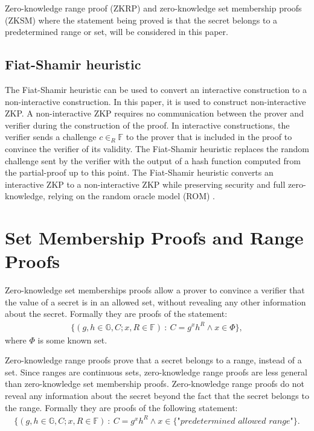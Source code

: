 Zero-knowledge range proof (ZKRP) and zero-knowledge set membership proofs (ZKSM) where the statement being proved is that the secret belongs to a predetermined range or set, will be considered in this paper.


\subsection*{Fiat-Shamir heuristic}
The Fiat-Shamir heuristic \cite{Fiat-Shamir} can be used to convert an interactive construction to a non-interactive construction. In this paper, it is used to construct non-interactive ZKP. A non-interactive  ZKP requires no communication between the prover and verifier during the construction of the proof. In interactive constructions, the verifier sends a challenge $c\in_R\mathds{F}$ to the prover that is included in the proof to convince the verifier of its validity. The Fiat-Shamir heuristic replaces the random challenge sent by the verifier with the output of a hash function computed from the partial-proof up to this point. The Fiat-Shamir heuristic converts an interactive ZKP to a non-interactive  ZKP while preserving security and full zero-knowledge, relying on the random oracle model (ROM) \cite{Fiat-Shamir} .




\section{Set Membership Proofs and Range Proofs}
\label{sec:RF_theory}
Zero-knowledge set memberships proofs allow a prover to convince a verifier that the value of a secret is in an allowed set, without revealing any other information about the secret. Formally they are proofs of the statement:
\begin{align} \label{eq:SM_statement}
    \{(g,h\in\mathds{G},C;x,R\in\mathds{F})\::\:C= g^x h^R \wedge x \in \Phi\},
\end{align}
where $\Phi$ is some known set. 
 
Zero-knowledge range proofs prove that a secret belongs to a range, instead of a set. Since ranges are continuous sets, zero-knowledge range proofs are less general than zero-knowledge set membership proofs.  Zero-knowledge range proofs do not reveal any information about the secret beyond the fact that the secret belongs to the range. Formally they are proofs of the following statement: 
\begin{align} \label{eq:RP_statement}
    \{(g,h\in\mathds{G},C;x,R\in\mathds{F})\::\:C= g^x h^R \wedge x \in \{\textit{"predetermined allowed range"}\}.
\end{align}

